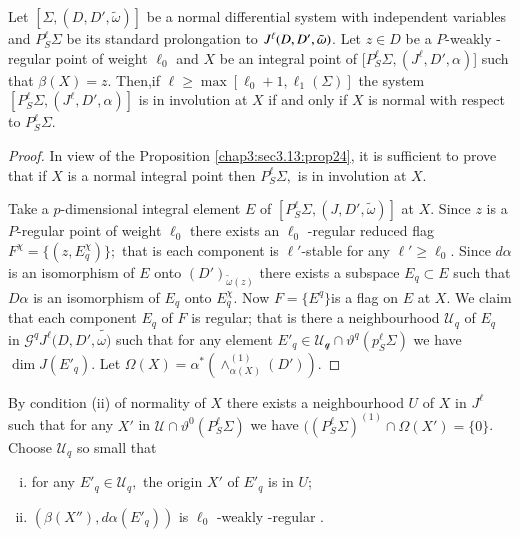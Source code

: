 \section{}\label{chap3:sec3.14}%

\begin{theorem}\label{chap3:sec3.14:thm5} %
  Let $\left[\Sigma,(D,D',\tilde\omega)\right]$ be a normal
  differential system with independent variables and $P^\ell_S \Sigma
  $ be its standard prolongation to  $J^\ell(D,D',\break \tilde{\omega})$.  
  Let $z \in D $ be a $P$-weakly -regular point of weight $\ell_0$
    and $X$ be an integral point of [$P_S^\ell \Sigma, (J^\ell,
      D', \alpha)$] such that $\beta(X) = z$. Then,if $\ell \geq
    \max [\ell_0 + 1 , \ell_1(\Sigma)]$ the system $[P_S^\ell
      \Sigma, (J^\ell, D', \alpha)]$ is in involution at $X$ if and
    only if $X$ is normal with respect to $P_S^\ell \Sigma$.  
\end{theorem}

\begin{proof}
  In view of the Proposition \ref{chap3:sec3.13:prop24}, it is sufficient to prove that if
  $X$ is a normal integral point then $P_S^\ell \Sigma, $ is in
  involution at $X$.  
  
  Take a $p$-dimensional integral element $E$ of $[P_S^\ell \Sigma,
    (J, D', \tilde{\omega})]$ at $X$. Since $z$ is a $P$-regular point
  of weight $\ell_0$ there  exists an $\ell_0$ -regular reduced flag
  $F^\chi= \{(z,E^\chi_q)\}; $ that is each component is
  $\ell'$-stable for any $\ell'\geq \ell_0$. Since $d \alpha $ is an
  isomorphism of $E$ onto $(D')_{\tilde\omega(z)} $ there exists a
  subspace $E_q \subset E $ such that $D \alpha$ is an isomorphism of
  $E_q$ onto $E^\chi_q$. Now  
  $ F= \{E^q\}$\pageoriginale is a flag on $E$ at $X$. We claim that  each component
  $E_q$ of $F$ is regular; that is there a neighbourhood
  $\mathcal{U}_q$ of $E_q$ in $\mathscr{G}^q
  J^\ell(D,D',\tilde{\omega)}$  such that for any element $ E'_q\in
  \mathscr{U_q} \cap \vartheta^q (p^\ell_S \Sigma)$ we have $ \dim
  J(E'_q)$. Let $\Omega(X) = \alpha^* (\wedge^{(1)}_{\alpha (X)}
  (D'))$. 
\end{proof}

By condition (ii) of normality of $X$ there exists a neighbourhood
$U$ of $X$ in $J^\ell $ such that for any $X'$ in $ \mathscr{U}\cap
\vartheta^0 (P_S^\ell \Sigma)$ we have $ ((P_S^\ell \Sigma)^{(1)}\cap
\Omega(X') = \{0\}$. Choose $\mathcal{U}_q$ so small that  
\begin{enumerate}[i)]
\item for any $E'_q \in \mathcal{U}_q, $ the origin $X'$ of $E'_q$ is in $U$; 
\item $(\beta (X'') , d\alpha  (E'_q))$ is $\ell_0 $ -weakly -regular . 
\end{enumerate} 

